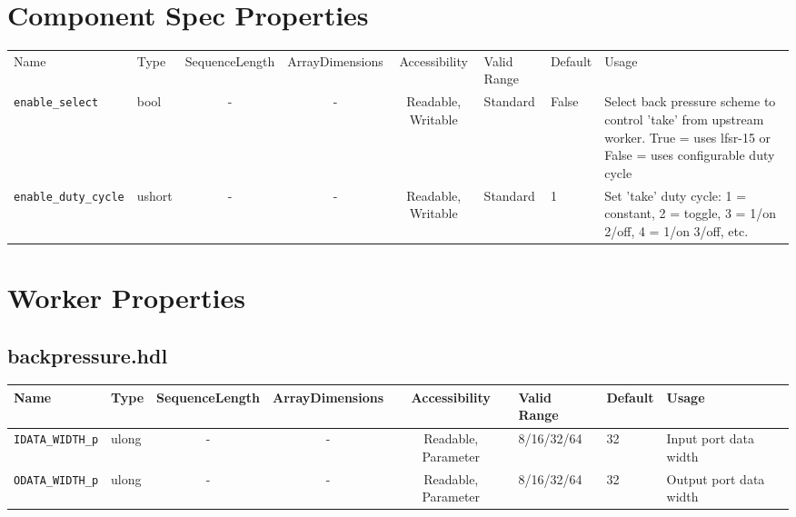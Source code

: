 \documentclass{article}
\def\comp{backpressure}
\begin{document}
\begin{landscape}
	\section*{Component Spec Properties}
	\begin{scriptsize}
		\begin{tabular}{|p{2cm}|p{1.5cm}|c|c|c|p{1.5cm}|p{1cm}|p{7cm}|}
			\hline
			\rowcolor{blue}
			Name                 & Type   & SequenceLength & ArrayDimensions & Accessibility       & Valid Range & Default & Usage                                                 \\
			\verb+enable_select+     & bool & -              & -               & Readable, Writable  & Standard    & False       & Select back pressure scheme to control 'take' from upstream worker. True = uses lfsr-15 or False = uses configurable duty cycle \\
			\hline
			\verb+enable_duty_cycle+   & ushort & -              & -               & Readable, Writable  & Standard    & 1    & Set 'take' duty cycle: 1 = constant, 2 = toggle, 3 = 1/on 2/off, 4 = 1/on 3/off, etc. \\
			\hline
		\end{tabular}
	\end{scriptsize}

	\section*{Worker Properties}
	\subsection*{\comp.hdl}
	\begin{scriptsize}
		\begin{tabular}{|p{2cm}|p{1.5cm}|c|c|c|p{1.5cm}|p{1cm}|p{7cm}|}
			\hline
			\rowcolor{blue}
			Name                      & Type  & SequenceLength & ArrayDimensions & Accessibility       & Valid Range & Default & Usage                                      \\
			\hline
			\verb+IDATA_WIDTH_p+ & ulong  & -              & -               & Readable, Parameter & 8/16/32/64  & 32      & Input port data width                                 \\
			\hline
			\verb+ODATA_WIDTH_p+ & ulong  & -              & -               & Readable, Parameter & 8/16/32/64  & 32      & Output port data width                                \\
			\hline
		\end{tabular}
	\end{scriptsize}


\end{landscape}
\end{document}
